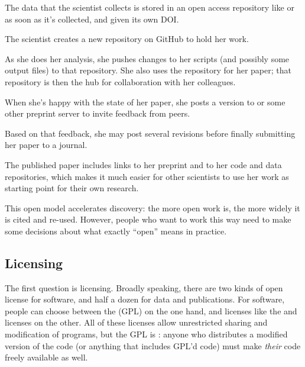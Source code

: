 \begin{swcitemize}
\item
  The data that the scientist collects is stored in an open access
  repository like  or
   as soon as it's collected, and
  given its own DOI.
\item
  The scientist creates a new repository on GitHub to hold her work.
\item
  As she does her analysis, she pushes changes to her scripts (and
  possibly some output files) to that repository. She also uses the
  repository for her paper; that repository is then the hub for
  collaboration with her colleagues.
\item
  When she's happy with the state of her paper, she posts a version to
   or some other preprint server to
  invite feedback from peers.
\item
  Based on that feedback, she may post several revisions before finally
  submitting her paper to a journal.
\item
  The published paper includes links to her preprint and to her code and
  data repositories, which makes it much easier for other scientists to
  use her work as starting point for their own research.
\end{swcitemize}

This open model accelerates discovery: the more open work is, the more
widely it is cited and re-used. However, people who want to work this
way need to make some decisions about what exactly ``open'' means in
practice.

\subsection*{Licensing}

The first question is licensing. Broadly speaking, there are two kinds
of open license for software, and half a dozen for data and
publications. For software, people can choose between the
 (GPL)
on the one hand, and licenses like the
 and
 licenses on the
other. All of these licenses allow unrestricted sharing and modification
of programs, but the GPL is :
anyone who distributes a modified version of the code (or anything that
includes GPL'd code) must make \emph{their} code freely available as
well.

